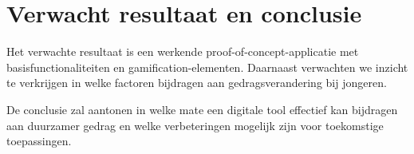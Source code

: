 \documentclass{hogent-article}
\begin{document}
    \section{Verwacht resultaat en conclusie}%
    \label{sec:results}
    
    Het verwachte resultaat is een werkende proof-of-concept-applicatie met
    basisfunctionaliteiten en gamification-elementen. Daarnaast verwachten we inzicht
    te verkrijgen in welke factoren bijdragen aan gedragsverandering bij jongeren.
    
    De conclusie zal aantonen in welke mate een digitale tool effectief kan bijdragen
    aan duurzamer gedrag en welke verbeteringen mogelijk zijn voor toekomstige
    toepassingen.
        
\printbibliography[heading=bibintoc]
\end{document}
